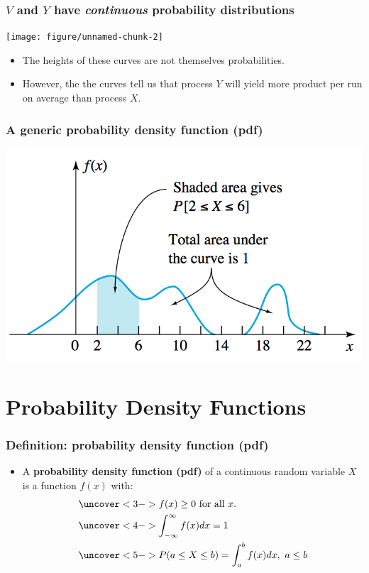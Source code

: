 \documentclass[handout]{beamer}\usepackage{graphicx, color}
\newenvironment{knitrout}{}{} %
\numberwithin{equation}{section}
\begin{document}
\begin{frame}
\frametitle{$V$ and $Y$ have \emph{continuous} probability distributions}

\begin{knitrout}
\color{fgcolor}
\texttt{[image: figure/unnamed-chunk-2]} 

\end{knitrout}

\begin{itemize}
\pause \item The heights of these curves are not themselves probabilities.
\pause \item However, the the curves tell us that process $Y$ will yield more product per run on average than process $X$.
\end{itemize}
\end{frame}

\begin{frame}
\frametitle{A generic probability density function (pdf)}
 \includegraphics{../../fig/genpdf.png}

\end{frame}


\section{Probability Density Functions}

\begin{frame}
\frametitle{Definition: probability density function (pdf)}
\begin{itemize}
\pause \item A {\bf probability density function (pdf)} of a continuous random variable $X$ is a function $f(x)$ with:
\begin{align*}
&\uncover<3->{f(x)   \ge 0 \text{ for all }x.} \\
&\uncover<4->{\int_{- \infty}^\infty f(x) dx = 1} \\
&\uncover<5->{P(a \le X \le b) = \int_a^b f(x) dx, \ a \le b}
\end{align*}
\end{itemize}
\end{frame}
\end{document}
